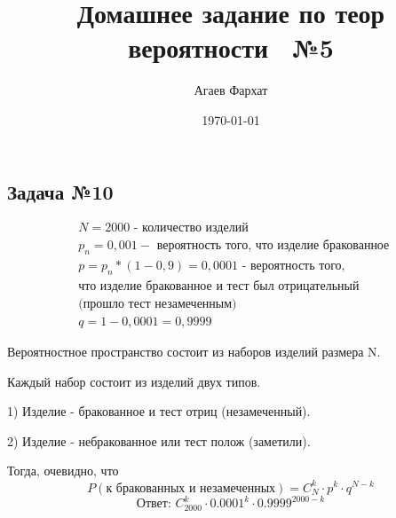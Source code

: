 \documentclass[a4paper, 12pt]{article} %
\author{Агаев Фархат}
\title{Домашнее задание по теор вероятности  №5}
\date{\today}
\begin{document}

\maketitle

\subsection*{Задача №10}
\begin{align*} 
    &N = 2000  \text{ - количество изделий} \\
    &p_{n} = 0,001 -\text{ вероятность того, что изделие бракованное }\\
    &p = p_n * (1 - 0,9) = 0,0001 \text{ - вероятность того, } \\
    &\text{что изделие бракованное и тест был отрицательный} \\ 
    &\text{(прошло тест незамеченным)} \\
    &q = 1 - 0,0001 = 0,9999 
\end{align*}

Вероятностное пространство состоит из наборов 
изделий размера N. 

Каждый набор состоит из изделий двух типов.

1) Изделие - бракованное и тест отриц (незамеченный).

2) Изделие - небракованное или тест полож (заметили).

Тогда, очевидно, что 
\[P(\text{к бракованных и незамеченных}) = C^k_N\cdot p^k \cdot q ^{N - k}\]
\[\text{Ответ: } C^{k}_{2000} \cdot 0.0001^k \cdot 0.9999^{2000 - k} \]
\end{document}
